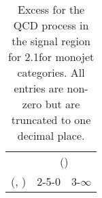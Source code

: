 \begin{table}[h!]
\tiny
\centering
\caption{Excess for the QCD process in the signal region for 2.1\ifb for monojet categories. All entries are non-zero but are truncated to one decimal place.\label{tab:excesssep_sig_qcd_mono}}
\begin{tabular}
{ccc}
	\hline\hline
	& \multicolumn{2}{c}{\scalht (\gev)} \\ 
	 (\njet,  \nb) & 2-5-0 & 3-$\infty$ \\ [0.8ex] 
\hline
	\hline
	\hline
\end{tabular}
\end{table}
